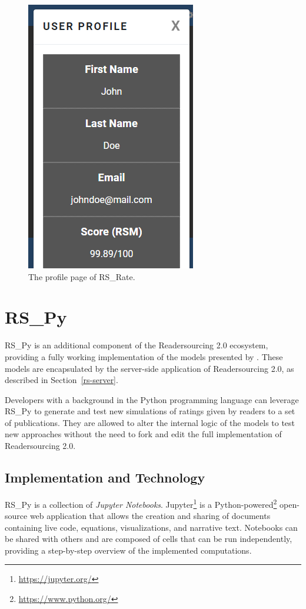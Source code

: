 \documentclass[a4paper, english]{article}
\newcommand{\rsrate}{RS\_Rate\xspace}
\newcommand{\rspy}{RS\_Py\xspace}
\begin{document}
\begin{figure}
\centering
\includegraphics[scale=0.7]{figures/profile.png}
\caption{The profile page of \rsrate.}
\label{fig:profile}
\end{figure}

\section{\rspy}

\label{rs-py}

\rspy \cite{RS-Py} is an additional component of the Readersourcing 2.0 ecosystem, providing a fully working implementation of the models presented by \citet{Soprano2019}. These models are encapsulated by the server-side application of Readersourcing 2.0, as described in Section~\ref{rs-server}. 

Developers with a background in the Python programming language can leverage \rspy to generate and test new simulations of ratings given by readers to a set of publications. They are allowed to alter the internal logic of the models to test new approaches without the need to fork and edit the full implementation of Readersourcing 2.0.

\subsection{Implementation and Technology}

\rspy is a collection of \emph{Jupyter Notebooks}. Jupyter\footnote{\url{https://jupyter.org/}} is a Python-powered\footnote{\url{https://www.python.org/}} open-source web application that allows the creation and sharing of documents containing live code, equations, visualizations, and narrative text. Notebooks can be shared with others and are composed of cells that can be run independently, providing a step-by-step overview of the implemented computations.
\end{document}
